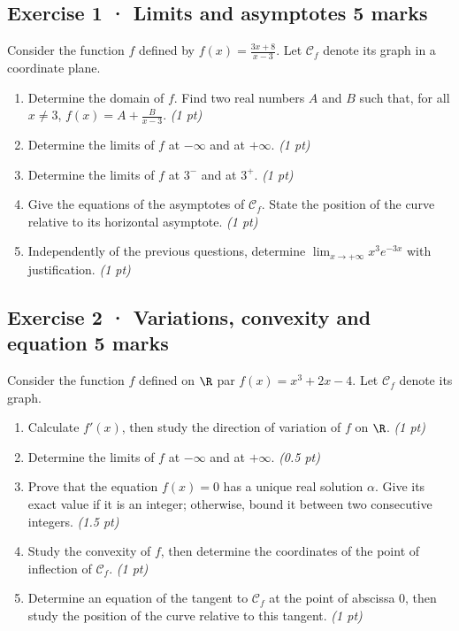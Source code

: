 \subsection*{Exercise 1 · Limits and asymptotes \hfill 5 marks}Consider the function $f$ defined by $f(x)=\frac{3x+8}{x-3}$. Let $\mathcal C_f$ denote its graph in a coordinate plane.

\begin{enumerate}

\item Determine the domain of $f$. Find two real numbers $A$ and $B$ such that, for all $x\ne3$, $f(x)=A+\frac B{x-3}$. \hfill\textit{(1 pt)}

\item Determine the limits of $f$ at $-\infty$ and at $+\infty$. \hfill\textit{(1 pt)}

\item Determine the limits of $f$ at $3^-$ and at $3^+$. \hfill\textit{(1 pt)}

\item Give the equations of the asymptotes of $\mathcal C_f$. State the position of the curve relative to its horizontal asymptote. \hfill\textit{(1 pt)}

\item Independently of the previous questions, determine $\displaystyle\lim_{x\to+\infty}x^{3}e^{-3x}$ with justification. \hfill\textit{(1 pt)}

\end{enumerate}

\subsection*{Exercise 2 · Variations, convexity and equation \hfill 5 marks}Consider the function $f$ defined on $\R$ par $f(x)=x^3+2x-4$. Let $\mathcal C_f$ denote its graph.

\begin{enumerate}

\item Calculate $f'(x)$, then study the direction of variation of $f$ on $\R$. \hfill\textit{(1 pt)}

\item Determine the limits of $f$ at $-\infty$ and at $+\infty$. \hfill\textit{(0.5 pt)}

\item Prove that the equation $f(x)=0$ has a unique real solution $\alpha$. Give its exact value if it is an integer; otherwise, bound it between two consecutive integers. \hfill\textit{(1.5 pt)}

\item Study the convexity of $f$, then determine the coordinates of the point of inflection of $\mathcal C_f$. \hfill\textit{(1 pt)}

\item Determine an equation of the tangent to $\mathcal C_f$ at the point of abscissa $0$, then study the position of the curve relative to this tangent. \hfill\textit{(1 pt)}

\end{enumerate}

